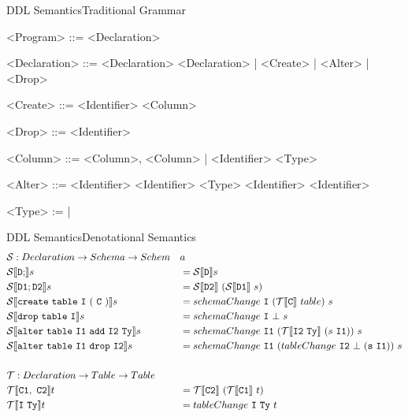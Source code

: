 \documentclass{beamer}
\newcommand{\cmp}[2]{
  \mathcal{#1}|[ \mathtt{ \StrSubstitute{#2}{ }{\ } } |]
}
\begin{document}
\begin{frame}[fragile]{DDL Semantics}{Traditional Grammar}
  \begin{grammar}
    <Program> ::= <Declaration>\lit*{;}

    <Declaration> ::= <Declaration>\lit*{;} <Declaration> | <Create> | <Alter> | <Drop>

    <Create> ::=  <Identifier> \lit*{(} <Column> \lit*{)}

    <Drop> ::=  <Identifier>

    <Column> ::= <Column>, <Column> | <Identifier> <Type>

    <Alter> ::=  <Identifier>  <Identifier> <Type>
           \alt {} <Identifier>  <Identifier>

    <Type> :=  | 
  \end{grammar}
\end{frame}

\begin{frame}[fragile]{DDL Semantics}{Denotational Semantics}
  \footnotesize
  \begin{alignat*}{2}
    &\mathcal{S} : Declaration -> Schema -> Schem&&a \\
    &\cmp{S}{D;}s &&= \cmp{S}{D}s \\
    &\cmp{S}{D1;D2}s &&= \cmp{S}{D2}\ (\cmp{S}{D1}\ s) \\
    &\cmp{S}{create table I ( C )} s &&=
      schemaChange\ \mathtt{I}\ (\cmp{T}{C}\ table)\ s \\
    &\cmp{S}{drop table I}s &&=
      schemaChange\ \mathtt{I}\ \bot\ s \\
    &\cmp{S}{alter table I1 add I2 Ty}s &&=
      schemaChange\ \mathtt{I1}\ (\cmp{T}{\mathtt{I2} Ty}\ (s\ \mathtt{I1}))\ s\\
    &\cmp{S}{alter table I1 drop I2}s &&=
      schemaChange\ \mathtt{I1}\ (tableChange\ \mathtt{I2}\ \bot\ (\mathtt{s}\ \mathtt{I1}))\ s \\
    \\
    &\mathcal{T} : Declaration -> Table -> Table && \\
    &\cmp{T}{C1, C2}t &&= \cmp{T}{C2}\ (\cmp{T}{C1}\ t) \\
    &\cmp{T}{I Ty}t &&= tableChange\ \mathtt{I}\ \mathtt{Ty}\ t \\
  \end{alignat*}
  \normalsize
\end{frame}
\end{document}
